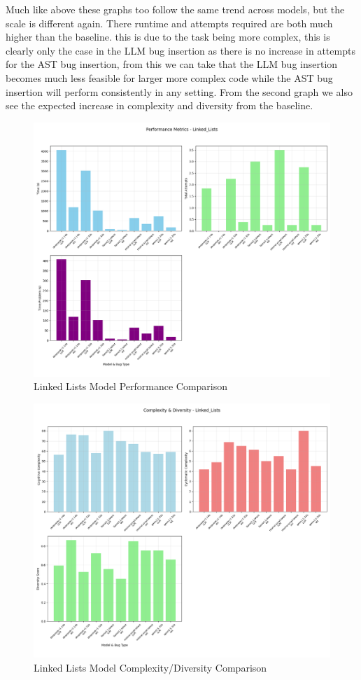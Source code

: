 \documentclass[12pt]{extarticle}
\begin{document}
Much like above these graphs too follow the same trend across models, but the scale is different again. There runtime and attempts required are both much higher than the baseline. this is due to the task being more complex, this is clearly only the case in the LLM bug insertion as there is no increase in attempts for the AST bug insertion, from this we can take that the LLM bug insertion becomes much less feasible for larger more complex code while the AST bug insertion will perform consistently in any setting. From the second graph we also see the expected increase in complexity and diversity from the baseline.

\begin{figure}[H]
\centering
\includegraphics[width=0.65\linewidth]{Images/Model_Comparison_Linked_Lists.png}
\caption{Linked Lists Model Performance Comparison}
\label{fig:Model_Comparison_Linked_Lists}
\end{figure}

\begin{figure}[H]
\centering
\includegraphics[width=0.65\linewidth]{Images/Complexity_Comparison_Linked_Lists.png}
\caption{Linked Lists Model Complexity/Diversity Comparison}
\label{fig:Complexity_Comparison_Linked_Lists}
\end{figure}
\end{document}
